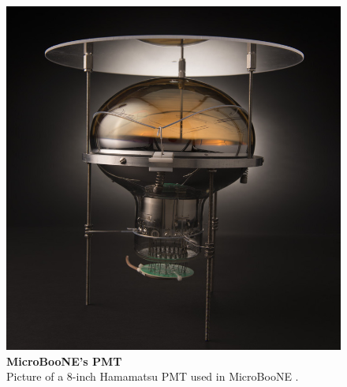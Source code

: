 \begin{figure}[h!]
    \begin{center}
        \includegraphics[scale=0.25]{Figures/microboone_pmt.jpeg}
        \caption[MicroBooNE's PMT]{{\textbf{MicroBooNE's PMT}} \\Picture of a $8$-inch Hamamatsu PMT used in MicroBooNE \cite{uboone_pmt}.}
        \label{uboone_pmt} 
    \end{center}
\end{figure}

